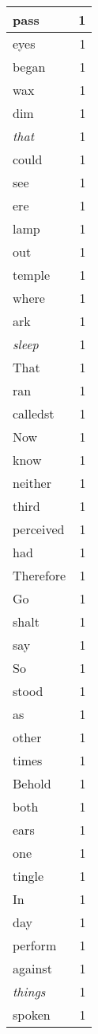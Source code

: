 \begin{center}
\begin{longtable}{l|r}
pass & 1 \\ \hline
eyes & 1 \\ \hline
began & 1 \\ \hline
wax & 1 \\ \hline
dim & 1 \\ \hline
\emph{that} & 1 \\ \hline
could & 1 \\ \hline
see & 1 \\ \hline
ere & 1 \\ \hline
lamp & 1 \\ \hline
out & 1 \\ \hline
temple & 1 \\ \hline
where & 1 \\ \hline
ark & 1 \\ \hline
\emph{sleep} & 1 \\ \hline
That & 1 \\ \hline
ran & 1 \\ \hline
calledst & 1 \\ \hline
Now & 1 \\ \hline
know & 1 \\ \hline
neither & 1 \\ \hline
third & 1 \\ \hline
perceived & 1 \\ \hline
had & 1 \\ \hline
Therefore & 1 \\ \hline
Go & 1 \\ \hline
shalt & 1 \\ \hline
say & 1 \\ \hline
So & 1 \\ \hline
stood & 1 \\ \hline
as & 1 \\ \hline
other & 1 \\ \hline
times & 1 \\ \hline
Behold & 1 \\ \hline
both & 1 \\ \hline
ears & 1 \\ \hline
one & 1 \\ \hline
tingle & 1 \\ \hline
In & 1 \\ \hline
day & 1 \\ \hline
perform & 1 \\ \hline
against & 1 \\ \hline
\emph{things} & 1 \\ \hline
spoken & 1 \\ \hline

\end{longtable}
\end{center}
